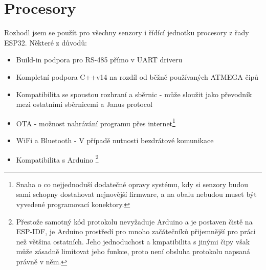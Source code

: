 \section{Procesory}

Rozhodl jsem se použít pro všechny senzory i řídící jednotku procesory z řady ESP32.
Některé z důvodů:
\begin{itemize}
    \item Build-in podpora pro RS-485 přímo v UART driveru
    \item Kompletní podpora C++v14 na rozdíl od běžně používaných ATMEGA čipů
    \item Kompatibilita se spoustou rozhraní a sběrnic - může sloužit jako převodník mezi ostatními sběrnicemi a Janus protocol
    \item OTA - možnost nahrávání programu přes internet\footnote{Snaha o co nejjednoduší dodatečné opravy systému, kdy si senzory budou sami schopny dostahovat nejnovější firmware, a na obalu nebudou muset být vyvedené programovací konektory.}
    \item WiFi a Bluetooth - V případě nutnosti bezdrátové komunikace
    \item Kompatibilita s Arduino \footnote{Přestože samotný kód protokolu nevyžaduje Arduino a je postaven čistě na ESP-IDF, je Arduino prostředí pro mnoho začátečníků přijemnější pro práci než většina ostatních. Jeho jednoduchost a kmpatibilita s jinými čipy však může zásadně limitovat jeho funkce, proto není obsluha protokolu napsaná právně v něm.}
\end{itemize}